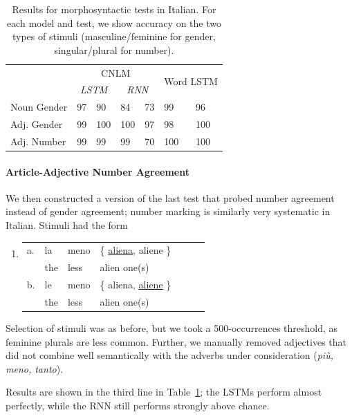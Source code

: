 \begin{table}[t]
  \begin{center}
    \begin{tabular}{l|ll|ll|ll}
	    & \multicolumn{4}{c|}{CNLM} & \multicolumn{2}{c}{\multirow{2}{*}{Word LSTM}}\\
	    &\multicolumn{2}{c|}{\emph{LSTM}}&\multicolumn{2}{c|}{\emph{RNN}} &\\ \hline
	    Noun Gender & 97&90  & 84&73 & 99&96 \\
	    Adj. Gender & 99&100 & 100&97 & 98&100 \\
	    Adj. Number & 99&99 & 99&70 & 100&100 \\
    \end{tabular}
  \end{center}
	\caption{\label{tab:ital-agr-results} Results for morphosyntactic tests in Italian. For each model and test, we show accuracy on the two types of stimuli (masculine/feminine for gender, singular/plural for number).}
\end{table}

\paragraph{Article-Adjective Number Agreement}
We then constructed a version of the last test that probed number agreement instead of gender agreement; number marking is similarly very systematic in Italian.
Stimuli had the form
\begin{enumerate}[label={(\arabic*)}]
	\item 
\begin{tabular}[t]{lllllll}
	a. & la & meno & \{ \underline{aliena}, aliene \} \\
   &  the & less & alien one(s)  \\
	b. & le & meno & \{ aliena, \underline{aliene} \} \\
    &the & less & alien one(s) \\
\end{tabular}
\end{enumerate}
Selection of stimuli was  as before, but  we took a 500-occurrences threshold, as feminine plurals are less common.
Further, we manually removed adjectives that did not combine well semantically with the adverbs under consideration (\emph{pi{\`u}, meno, tanto}).

Results are shown in the third line in Table~\ref{tab:ital-agr-results}; the LSTMs perform almost perfectly, while the RNN still performs strongly above chance.






